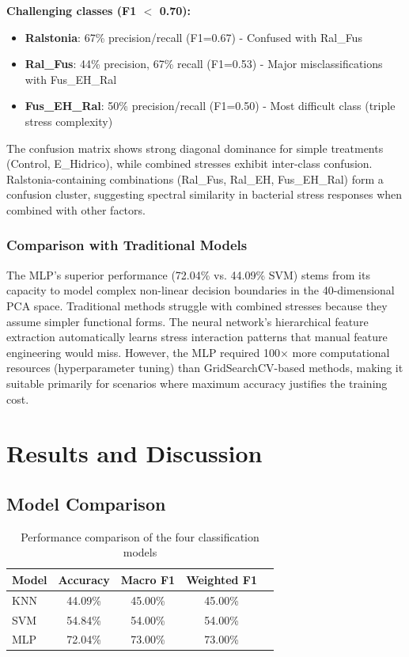 \documentclass[12pt,a4paper]{article}
\begin{document}
\textbf{Challenging classes (F1 $<$ 0.70):}
\begin{itemize}
    \item \textbf{Ralstonia}: 67\% precision/recall (F1=0.67) - Confused with Ral\_Fus
    \item \textbf{Ral\_Fus}: 44\% precision, 67\% recall (F1=0.53) - Major misclassifications with Fus\_EH\_Ral  
    \item \textbf{Fus\_EH\_Ral}: 50\% precision/recall (F1=0.50) - Most difficult class (triple stress complexity)
\end{itemize}

The confusion matrix shows strong diagonal dominance for simple treatments (Control, E\_Hidrico), while combined stresses exhibit inter-class confusion. Ralstonia-containing combinations (Ral\_Fus, Ral\_EH, Fus\_EH\_Ral) form a confusion cluster, suggesting spectral similarity in bacterial stress responses when combined with other factors.

\subsubsection{Comparison with Traditional Models}

The MLP's superior performance (72.04\% vs. 44.09\% SVM) stems from its capacity to model complex non-linear decision boundaries in the 40-dimensional PCA space. Traditional methods struggle with combined stresses because they assume simpler functional forms. The neural network's hierarchical feature extraction automatically learns stress interaction patterns that manual feature engineering would miss. However, the MLP required 100× more computational resources (hyperparameter tuning) than GridSearchCV-based methods, making it suitable primarily for scenarios where maximum accuracy justifies the training cost.


\newpage
\section{Results and Discussion}
\label{sec:results}

\subsection{Model Comparison}

\begin{table}[H]
\centering
\caption{Performance comparison of the four classification models}
\label{tab:model_comparison}
\begin{tabular}{lcccc}
\toprule
\textbf{Model} & \textbf{Accuracy} & \textbf{Macro F1} & \textbf{Weighted F1} \\
\midrule
KNN & 44.09\% & 45.00\% & 45.00\% \\
SVM & 54.84\% & 54.00\% & 54.00\% \\
MLP & 72.04\% & 73.00\% & 73.00\% \\
\bottomrule
\end{tabular}
\end{table}
\end{document}
